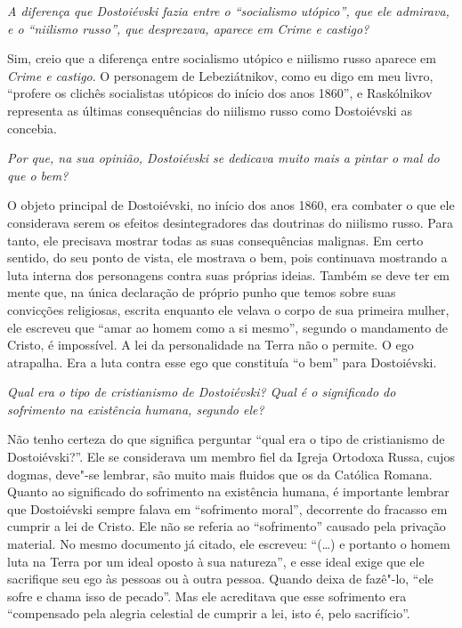 \emph{A diferença que Dostoiévski fazia entre o ``socialismo utópico'', que
ele admirava, e o ``niilismo russo'', que desprezava, aparece em \emph{Crime e
castigo}?}

Sim, creio que a diferença entre socialismo utópico e niilismo russo
aparece em \emph{Crime e castigo}. O personagem de Lebeziátnikov, como eu
digo em meu livro, ``profere os clichês socialistas utópicos do início
dos anos 1860'', e Raskólnikov representa as últimas consequências do
niilismo russo como Dostoiévski as concebia.

\medskip

\emph{Por que, na sua opinião, Dostoiévski se dedicava muito mais a pintar
o mal do que o bem?}

O objeto principal de Dostoiévski, no início dos anos 1860, era combater
o que ele considerava serem os efeitos desintegradores das doutrinas do
niilismo russo. Para tanto, ele precisava mostrar todas as suas
consequências malignas. Em certo sentido, do seu ponto de vista, ele
mostrava o bem, pois continuava mostrando a luta interna dos personagens
contra suas próprias ideias. Também se deve ter em mente que, na única
declaração de próprio punho que temos sobre suas convicções religiosas,
escrita enquanto ele velava o corpo de sua primeira mulher, ele escreveu
que ``amar ao homem como a si mesmo'', segundo o mandamento de Cristo, é
impossível. A lei da personalidade na Terra não o permite. O
ego atrapalha. Era a luta contra esse ego que constituía ``o bem'' para
Dostoiévski.

\medskip

\emph{Qual era o tipo de cristianismo de Dostoiévski? Qual é o significado
do sofrimento na existência humana, segundo ele?}

Não tenho certeza do que significa perguntar ``qual era o tipo de
cristianismo de Dostoiévski?''. Ele se considerava um membro fiel da
Igreja Ortodoxa Russa, cujos dogmas, deve"-se lembrar, são muito mais
fluidos que os da Católica Romana. Quanto ao significado do sofrimento
na existência humana, é importante lembrar que Dostoiévski sempre falava
em ``sofrimento moral'', decorrente do fracasso em cumprir a lei de
Cristo. Ele não se referia ao ``sofrimento'' causado pela privação
material. No mesmo documento já citado, ele escreveu: ``(\ldots{}) e portanto o homem
luta na Terra por um ideal oposto à sua natureza'', e esse
ideal exige que ele sacrifique seu ego às pessoas ou à outra pessoa.
Quando deixa de fazê"-lo, ``ele sofre e chama isso de pecado''. Mas ele
acreditava que esse sofrimento era ``compensado pela alegria celestial de
cumprir a lei, isto é, pelo sacrifício''.

